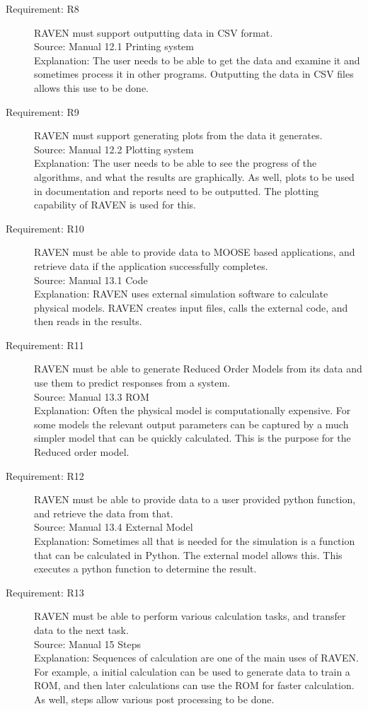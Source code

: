 \documentclass{article}
\newcommand{\requirement}[4]{\item[Requirement: #1] #2 \\Source: #3\\Explanation: #4}
\begin{document}
\begin{description}
\requirement{R8}{RAVEN must support outputting data in CSV format.}
{Manual 12.1 Printing system}
{The user needs to be able to get the data and examine it and sometimes process it in other programs.  Outputting the data in CSV files allows this use to be done.}

\requirement{R9}{RAVEN must support generating plots from the data it generates.}
{Manual 12.2 Plotting system}
{The user needs to be able to see the progress of the algorithms, and what the results are graphically.  As well, plots to be used in documentation and reports need to be outputted.  The plotting capability of RAVEN is used for this.}

\requirement{R10}{RAVEN must be able to provide data to MOOSE based applications, and retrieve data if the application successfully completes.}
{Manual 13.1 Code}
{RAVEN uses external simulation software to calculate physical models.  RAVEN creates input files, calls the external code, and then reads in the results.}

\requirement{R11}{RAVEN must be able to generate Reduced Order Models from its data and use them to predict responses from a system.}
{Manual 13.3 ROM}
{Often the physical model is computationally expensive.  For some models the relevant output parameters can be captured by a much simpler model that can be quickly calculated.  This is the purpose for the Reduced order model.}

\requirement{R12}{RAVEN must be able to provide data to a user provided python function, and retrieve the data from that.}
{Manual 13.4 External Model}
{Sometimes all that is needed for the simulation is a function that can be calculated in Python.  The external model allows this.  This executes a python function to determine the result.}

\requirement{R13}{RAVEN must be able to perform various calculation tasks, and transfer data to the next task.}
{Manual 15 Steps}
{Sequences of calculation are one of the main uses of RAVEN.  For example, a initial calculation can be used to generate data to train a ROM, and then later calculations can use the ROM for faster calculation.  As well, steps allow various post processing to be done.}

\end{description}
\end{document}
